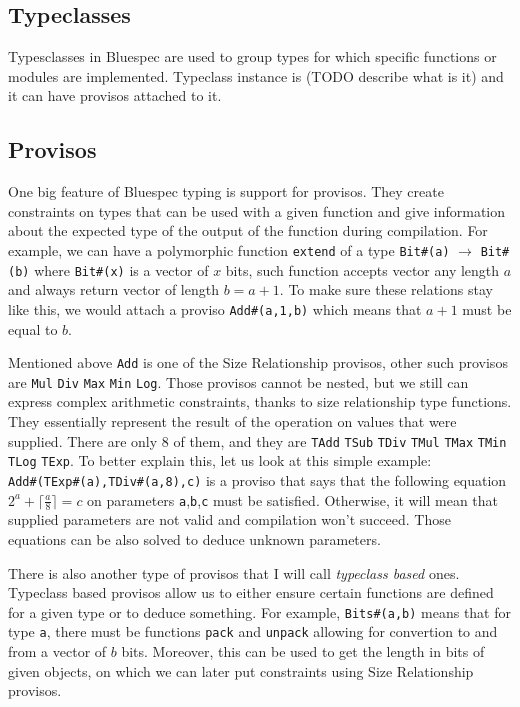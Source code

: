 \documentclass[12pt]{report}
\begin{document}
\subsection{Typeclasses}
\label{sec:Typeclasses}
Typesclasses in Bluespec are used to group types for which specific functions or modules are implemented. Typeclass instance is (TODO describe what is it) and it can have provisos attached to it.

\subsection{Provisos}
\label{sec:Provisos}
One big feature of Bluespec typing is support for provisos. They create constraints on types that can be used with a given function and give information about the expected type of the output of the function during compilation. For example, we can have a polymorphic function \verb!extend! of a type \verb!Bit#(a)! $\rightarrow$ \verb!Bit#(b)! where \verb!Bit#(x)! is a vector of $x$ bits, such function accepts vector any length $a$ and always return vector of length $b=a+1$. To make sure these relations stay like this, we would attach a proviso \verb!Add#(a,1,b)! which means that $a+1$ must be equal to $b$.  
\par  
Mentioned above \verb!Add! is one of the Size Relationship provisos, other such provisos are \verb!Mul! \verb!Div! \verb!Max! \verb!Min! \verb!Log!.  
Those provisos cannot be nested, but we still can express complex arithmetic constraints, thanks to size relationship type functions.  
They essentially represent the result of the operation on values that were supplied. There are only 8 of them, and they are \verb!TAdd! \verb!TSub! \verb!TDiv! \verb!TMul! \verb!TMax! \verb!TMin! \verb!TLog! \verb!TExp!.  
To better explain this, let us look at this simple example: \\  
\verb!Add#(TExp#(a),TDiv#(a,8),c)! is a proviso that says that the following equation $2^a+\lceil\frac{a}{8}\rceil = c$ on parameters \verb!a!,\verb!b!,\verb!c! must be satisfied. Otherwise, it will mean that supplied parameters are not valid and compilation won't succeed. Those equations can be also solved to deduce unknown parameters.  
\par  
There is also another type of provisos that I will call \emph{typeclass based} ones.  
Typeclass based provisos allow us to either ensure certain functions are defined for a given type or to deduce something. For example, \verb!Bits#(a,b)! means that for type \verb!a!, there must be functions \verb!pack! and \verb!unpack! allowing for convertion to and from a vector of $b$ bits. Moreover, this can be used to get the length in bits of given objects, on which we can later put constraints using Size Relationship provisos.  
\end{document}
